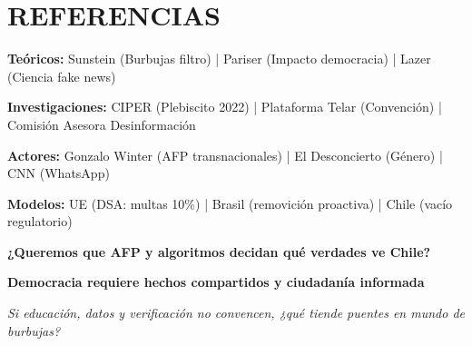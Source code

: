 \section*{\textcolor{ucblue}{\LARGE REFERENCIAS}}

{\fontsize{16}{20}\selectfont
\textbf{Teóricos:} Sunstein (Burbujas filtro) | Pariser (Impacto democracia) | Lazer (Ciencia fake news)

\textbf{Investigaciones:} CIPER (Plebiscito 2022) | Plataforma Telar (Convención) | Comisión Asesora Desinformación

\textbf{Actores:} Gonzalo Winter (AFP transnacionales) | El Desconcierto (Género) | CNN (WhatsApp)

\textbf{Modelos:} UE (DSA: multas 10\%) | Brasil (removición proactiva) | Chile (vacío regulatorio)
}

\vspace{0.6cm}

\begin{center}
{\fontsize{22}{26}\selectfont \textbf{\textcolor{ucred}{¿Queremos que AFP y algoritmos decidan qué verdades ve Chile?}}}

\vspace{0.2cm}

{\fontsize{20}{24}\selectfont \textbf{\textcolor{ucgreen}{Democracia requiere hechos compartidos y ciudadanía informada}}}

\vspace{0.1cm}

{\fontsize{18}{22}\selectfont \textit{Si educación, datos y verificación no convencen, ¿qué tiende puentes en mundo de burbujas?}}
\end{center}